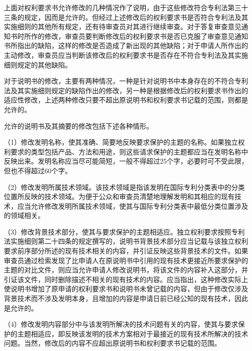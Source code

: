 上面对权利要求书允许修改的几种情况作了说明，由于这些修改符合专利法第三十三条的规定，因而是允许的。但经过上述修改后的权利要求书是否符合专利法及其实施细则的其他所有规定，还有待审查员对其进行继续审查。对于答复审查意见通知书时所作的修改，审查员要判断修改后的权利要求书是否已克服了审查意见通知书所指出的缺陷，这样的修改是否造成了新出现的其他缺陷；对于申请人所作出的主动修改，审查员应当判断该修改后的权利要求书是否存在不符合专利法及其实施细则规定的其他缺陷。

对于说明书的修改，主要有两种情况，一种是针对说明书中本身存在的不符合专利法及其实施细则规定的缺陷作出的修改，另一种是根据修改后的权利要求书作出的适应性修改，上述两种修改只要不超出原说明书和权利要求书记载的范围，则都是允许的。

允许的说明书及其摘要的修改包括下述各种情形。

{\setlength{\parindent}{17.1bp}（1）修改发明名称，使其准确、简要地反映要求保护的主题的名称。如果独立权利要求的类型包括产品、方法和用途，则这些请求保护的主题都应当在发明名称中反映出来。发明名称应当尽可能简短，一般不得超过25个字，必要时可不受此限，但也不得超过60个字。\par}

{\setlength{\parindent}{17.1bp}（2）修改发明所属技术领域。该技术领域是指该发明在国际专利分类表中的分类位置所反映的技术领域。为便于公众和审查员清楚地理解发明和其相应的现有技术，应当允许修改发明所属技术领域，使其与国际专利分类表中最低分类位置涉及的领域相关。\par}

{\setlength{\parindent}{17.1bp}（3）修改背景技术部分，使其与要求保护的主题相适应。独立权利要求按照专利法实施细则第二十四条的规定撰写的，说明书背景技术部分应当记载与该独立权利要求前序部分所述的现有技术相关的内容，并引证反映这些背景技术的文件。如果审查员通过检索发现了比申请人在原说明书中引用的现有技术更接近所要求保护的主题的对比文件，则应当允许申请人修改说明书，将该文件的内容补入这部分，并引证该文件，同时删除描述不相关的现有技术的内容。应当指出，这种修改实际上使说明书增加了原申请的权利要求书和说明书未曾记载的内容，但由于修改仅涉及背景技术而不涉及发明本身，且增加的内容是申请日前已经公知的现有技术，因此是允许的。\par}

{\setlength{\parindent}{17.1bp}（4）修改发明内容部分中与该发明所解决的技术问题有关的内容，使其与要求保护的主题相适应，即反映该发明的技术方案相对于最接近的现有技术所解决的技术问题。当然，修改后的内容不应超出原说明书和权利要求书记载的范围。\par}

